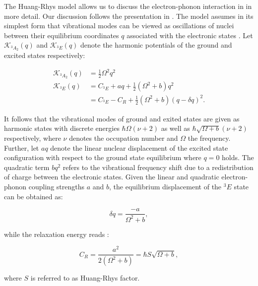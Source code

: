     The Huang-Rhys model allows us to discuss the electron-phonon interaction in \sivs in more detail. Our discussion follows the presentation in \cite{Doherty2013}. The model assumes in its simplest form that vibrational modes can be viewed as oscillations of nuclei between their equilibrium coordinates $q$ associated with the electronic states \cite{Riedrich-moller2014}. Let $\mathcal{K}_{{}^{3}A_{2}}(q)$ and $\mathcal{K}_{{}^{3}E}(q)$ denote the harmonic potentials of the ground and excited states respectively:

    \begin{align}
      \mathcal{K}_{{}^{3}A_{2}}(q) & = \frac{1}{2} \Omega^2 q^2 \\
      \mathcal{K}_{{}^{3}E}(q) & = C_{{}^{3}E} + aq + \frac{1}{2} (\Omega^2 + b)q^2 \\
       & = C_{{}^{3}E} - C_R + \frac{1}{2} (\Omega^2 + b)(q - \delta q)^2.
    \end{align}

    It follows that the vibrational modes of ground and exited states are given as harmonic states with discrete energies $\hbar \Omega (\nu + 2)$ as well as $\hbar \sqrt{\Omega + b} (\nu + 2)$ respectively, where $\nu$ denotes the occupation number and $\Omega$ the frequency.
    Further, let $aq$ denote the linear nuclear displacement of the excited state configuration with respect to the ground state equilibrium where $q = 0$ holds.
    The quadratic term $bq^2$ refers to the vibrational frequency shift due to a redistribution of charge between the electronic states.
    Given the linear and quadratic electron-phonon coupling strengths $a$ and $b$, the equilibrium displacement of the ${}^{3}E$ state can be obtained as:

    \begin{equation}
      \delta q = \frac{-a}{\Omega^2 + b },
    \end{equation}

    while the relaxation energy reads \cite{Doherty2013}:

    \begin{equation}
      C_R = \frac{a^2}{2 (\Omega^2 + b)} = \hbar S \sqrt{\Omega + b},
    \end{equation}


   where $S$ is referred to as Huang-Rhys factor.

